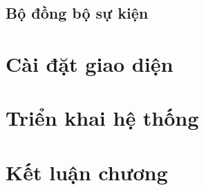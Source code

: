 \BangAPI

\subsection{Bộ đồng bộ sự kiện}
\label{subsec:indexer}

\section{Cài đặt giao diện}
\label{sec:caidat-frontend}

\section{Triển khai hệ thống}
\label{sec:trienkhai}

\HinhTrienKhai

\section{Kết luận chương}
